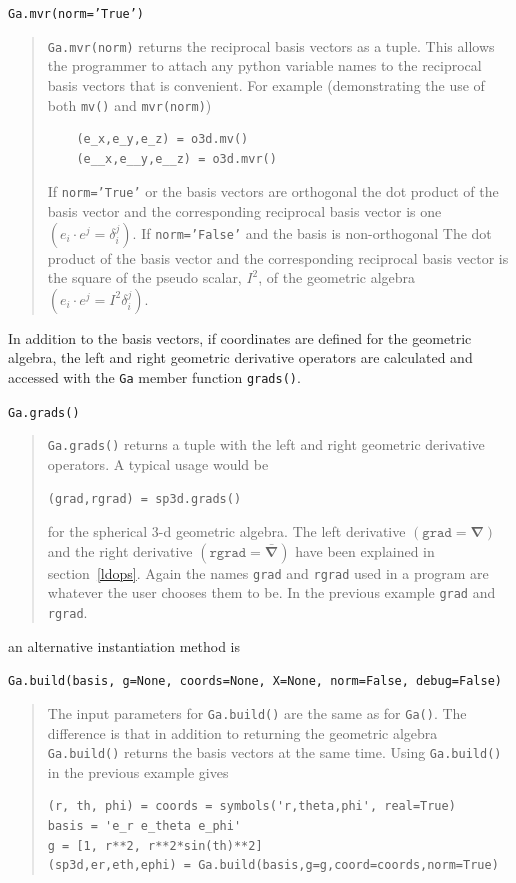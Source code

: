 \documentclass[12pt]{report}
\newcommand{\bm}[1]{\boldsymbol{#1}}
\newcommand{\lp}{\left (}
\newcommand{\rp}{\right )}
\newcommand{\paren}[1]{\lp {#1} \rp}
\newcommand{\T}[1]{\texttt{#1}}
\begin{document}
\T{Ga.mvr(norm='True')}
\begin{quote}
    \T{Ga.mvr(norm)} returns the reciprocal basis vectors as a tuple.  This allows the programmer to
    attach any python variable names to the reciprocal basis vectors that is convenient. For example
    (demonstrating the use of both \T{mv()} and \T{mvr(norm)})
   \begin{lstlisting}
    (e_x,e_y,e_z) = o3d.mv()
    (e__x,e__y,e__z) = o3d.mvr()
    \end{lstlisting}
    If \T{norm='True'} or the basis vectors are orthogonal
    the dot product of the basis vector and the corresponding reciprocal basis vector is one
    $\paren{e_{i}\cdot e^{j}=\delta_{i}^{j}}$.  If \T{norm='False'} and the basis is non-orthogonal
    The dot product of the basis vector and the corresponding reciprocal basis vector is the square of the
    pseudo scalar, $I^{2}$, of the geometric algebra $\paren{e_{i}\cdot e^{j}=I^{2}\delta_{i}^{j}}$.
\end{quote}

In addition to the basis vectors, if coordinates are defined for the geometric algebra, the
left and right geometric derivative operators are calculated and accessed with the \T{Ga}
member function \T{grads()}.

\T{Ga.grads()}
\begin{quote}
    \T{Ga.grads()} returns a tuple with the left and right geometric derivative operators. A
    typical usage would be
    \begin{lstlisting}[numbers=none]
    (grad,rgrad) = sp3d.grads()
    \end{lstlisting}
    for the spherical 3-d geometric algebra. The left derivative $\paren{\T{grad} =\bm{\nabla}}$ and the
    right derivative $\paren{\T{rgrad} = \bm{\bar{\nabla}}}$ have been explained in section~\ref{ldops}. Again
    the names \T{grad} and \T{rgrad} used in a program are whatever the user chooses them to be.  In the previous
    example \T{grad} and \T{rgrad}.
\end{quote}

an alternative instantiation method is

\T{Ga.build(basis, g=None, coords=None, X=None, norm=False, debug=False)}
\begin{quote}
    The input parameters for \T{Ga.build()} are the same as for \T{Ga()}.  The difference is
    that in addition to returning the geometric algebra \T{Ga.build()} returns the basis vectors
    at the same time. Using \T{Ga.build()} in the previous example gives
   \begin{lstlisting}
(r, th, phi) = coords = symbols('r,theta,phi', real=True)
basis = 'e_r e_theta e_phi'
g = [1, r**2, r**2*sin(th)**2]
(sp3d,er,eth,ephi) = Ga.build(basis,g=g,coord=coords,norm=True)
    \end{lstlisting}

\end{quote}
\end{document}
